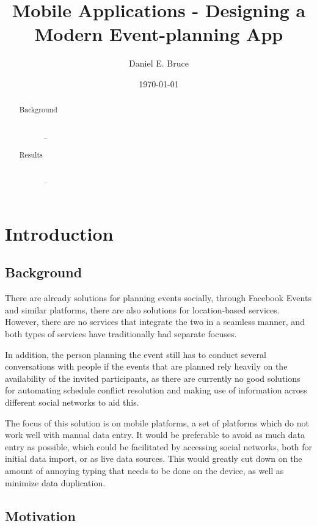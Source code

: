 \documentclass[a4paper,11pt]{report}
\begin{document}
\title{Mobile Applications - Designing a Modern Event-planning App}
\author{Daniel E. Bruce}
\date{\today}
\maketitle

\begin{abstract}
  \begin{description}
    \item[Background] \hfill \\
      --
    \item[Results] \hfill \\
      --
  \end{description}
\end{abstract}

\tableofcontents

\chapter{Introduction}

\section{Background}

There are already solutions for planning events socially, through Facebook
Events and similar platforms, there are also solutions for location-based
services. However, there are no services that integrate the two in a seamless
manner, and both types of services have traditionally had separate focuses.

In addition, the person planning the event still has to conduct several
conversations with people if the events that are planned rely heavily on the
availability of the invited participants, as there are currently no good
solutions for automating schedule conflict resolution and making use of
information across different social networks to aid this.

The focus of this solution is on mobile platforms, a set of platforms which do
not work well with manual data entry\cite{brown:fourkey}. It would be preferable
to avoid as much data entry as possible, which could be facilitated by accessing
social networks, both for initial data import, or as live data sources. This
would greatly cut down on the amount of annoying typing that needs to be done on
the device, as well as minimize data duplication.

\section{Motivation}
\end{document}
